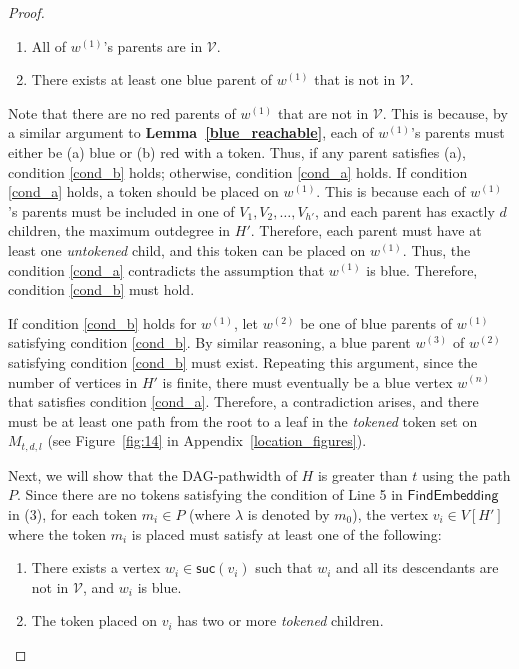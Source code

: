 \documentclass[runningheads]{llncs}
\theoremstyle{plain}
\theoremstyle{definition}
\begin{document}
\begin{proof}
\begin{enumerate}
    \item All of $w^{(1)}$'s parents are in $\mathcal{V}$. \label{cond_a}
    \item There exists at least one blue parent of $w^{(1)}$ that is not in $\mathcal{V}$. \label{cond_b}
\end{enumerate}

    Note that there are no red parents of $w^{(1)}$ that are not in $\mathcal{V}$. This is because, by a similar argument to \textbf{Lemma~\ref{blue_reachable}}, each of $w^{(1)}$'s parents must either be (a) blue or (b) red with a token. Thus, if any parent satisfies (a), condition \ref{cond_b} holds; otherwise, condition \ref{cond_a} holds. If condition \ref{cond_a} holds, a token should be placed on $w^{(1)}$. This is because each of $w^{(1)}$'s parents must be included in one of $V_1, V_2, \dots, V_{h'}$, and each parent has exactly $d$ children, the maximum outdegree in $H'$. Therefore, each parent must have at least one \textit{untokened} child, and this token can be placed on $w^{(1)}$. Thus, the condition \ref{cond_a} contradicts the assumption that $w^{(1)}$ is blue. Therefore, condition \ref{cond_b} must hold. 
    
    If condition \ref{cond_b} holds for $w^{(1)}$, let $w^{(2)}$ be one of blue parents of $w^{(1)}$ satisfying condition \ref{cond_b}. By similar reasoning, a blue parent $w^{(3)}$ of $w^{(2)}$ satisfying condition \ref{cond_b} must exist. Repeating this argument, since the number of vertices in $H'$ is finite, there must eventually be a blue vertex $w^{(n)}$ that satisfies condition \ref{cond_a}. Therefore, a contradiction arises, and there must be at least one path from the root to a leaf in the \textit{tokened} token set on $M_{t, d, l}$ (see Figure~\ref{fig:14} in Appendix~\ref{location_figures}).
    
    Next, we will show that the DAG-pathwidth of $H$ is greater than $t$ using the path $P$. Since there are no tokens satisfying the condition of Line 5 in $\mathsf{FindEmbedding}$ in (3), for each token $m_i \in P$ (where $\lambda$ is denoted by $m_0$), the vertex $v_i \in V[H']$ where the token $m_i$ is placed must satisfy at least one of the following:
    
    \begin{enumerate}
        \item There exists a vertex $w_i \in \mathsf{suc}(v_i)$ such that $w_i$ and all its descendants are not in $\mathcal{V}$, and $w_i$ is blue. \label{cond1}
        \item The token placed on $v_i$ has two or more \textit{tokened} children. \label{cond2}
    \end{enumerate}
    

\end{proof}
\end{document}
